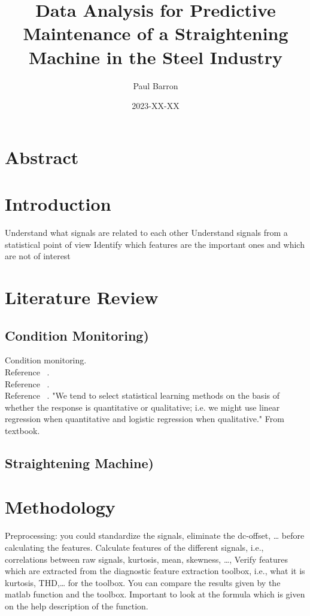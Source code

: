 \documentclass{article}
\title{Data Analysis for Predictive Maintenance of a Straightening Machine in the Steel Industry}
\date{2023-XX-XX}
\author{Paul Barron}
\begin{document}
\maketitle
\newpage
{}
\tableofcontents
\newpage
\section{Abstract}
 
\newpage
\section{Introduction}

Understand what signals are related to each other
Understand signals from a statistical point of view
Identify which features are the important ones and which are not of interest

\newpage  
\section{Literature Review}
\subsection{Condition Monitoring)}
Condition monitoring.\\
Reference ~\cite{caesarendra2017review}.\\
Reference ~\cite{james2013introduction}.\\
Reference ~\cite{soualhi2021novel}.
"We tend to select statistical learning methods on the basis of whether
the response is quantitative or qualitative; i.e. we might use linear regression
when quantitative and logistic regression when qualitative." From textbook.
\subsection{Straightening Machine)}
\newpage  
\section{Methodology}
Preprocessing: you could standardize the signals, eliminate the dc-offset, … before calculating the features.
Calculate features of the different signals, i.e., correlations between raw signals, kurtosis, mean, skewness, …,
Verify features which are extracted from the diagnostic feature extraction toolbox, i.e., what it is kurtosis, THD,… for the toolbox. You can compare the results given by the matlab function and the toolbox. Important to look at the formula which is given on the help description of the function.
\end{document}
